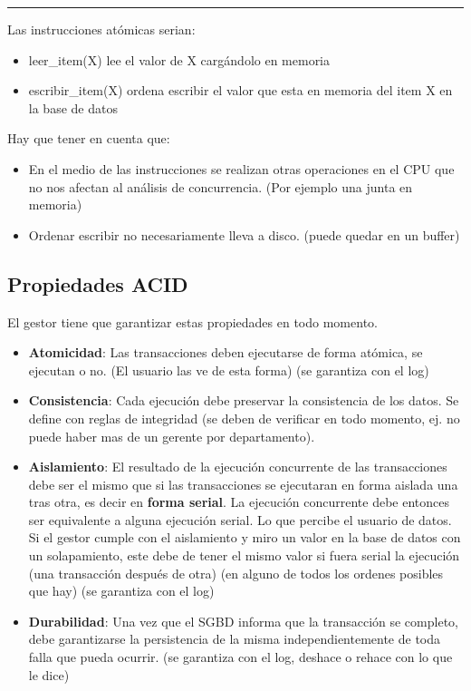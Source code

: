 \noindent\rule{\textwidth}{0.5pt}

Las instrucciones atómicas serian:
\begin{itemize}
\item leer\_item(X) lee el valor de X cargándolo en memoria
\item escribir\_item(X) ordena escribir el valor que esta en memoria del item X en la base de datos
\end{itemize}

Hay que tener en cuenta que:
\begin{itemize}
\item En el medio de las instrucciones se realizan otras operaciones en el CPU que no nos afectan al análisis de concurrencia. (Por ejemplo una junta en memoria)
\item Ordenar escribir no necesariamente lleva a disco. (puede quedar en un buffer)
\end{itemize}


\subsection*{Propiedades ACID}

El gestor tiene que garantizar estas propiedades en todo momento.

\begin{itemize}
\item \textbf{Atomicidad}: Las transacciones deben ejecutarse de forma atómica, se ejecutan o no. (El usuario las ve de esta forma) (se garantiza con el log)
\item \textbf{Consistencia}: Cada ejecución debe preservar la consistencia de los datos. Se define con reglas de integridad (se deben de verificar en todo momento, ej. no puede haber mas de un gerente por departamento).
\item \textbf{Aislamiento}: El resultado de la ejecución concurrente de las transacciones debe ser el mismo que si las transacciones se ejecutaran en forma aislada una tras otra, es decir en \textbf{forma serial}. La ejecución concurrente debe entonces ser equivalente a alguna ejecución serial. Lo que percibe el usuario de datos. Si el gestor cumple con el aislamiento y miro un valor en la base de datos con un solapamiento, este debe de tener el mismo valor si fuera serial la ejecución (una transacción después de otra) (en alguno de todos los ordenes posibles que hay) (se garantiza con el log)
\item \textbf{Durabilidad}: Una vez que el SGBD informa que la transacción se completo, debe garantizarse la persistencia de la misma independientemente de toda falla que pueda ocurrir. (se garantiza con el log, deshace o rehace con lo que le dice)
\end{itemize}



